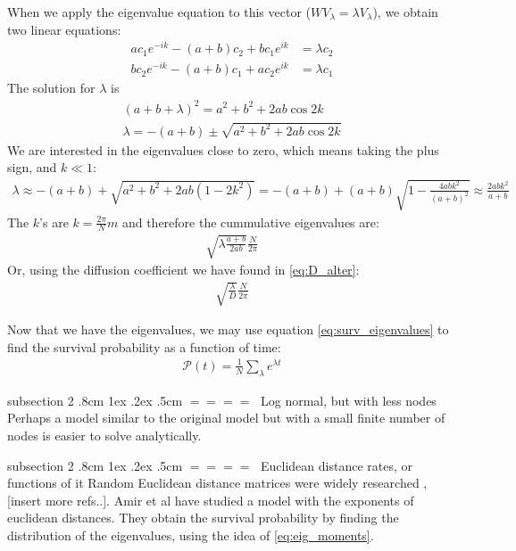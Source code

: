 \documentclass[onecolumn,fleqn,notitlepage,secnumarabic]{revtex4}
\makeatletter
\def\subsection{%
  \@startsection
    {subsection}%
    {2}%
    {\z@}%
    {.8cm \@plus1ex \@minus .2ex}%
    {.5cm}%
    {\normalfont\small\bfseries$=\!=\!=\!=\;$}%
}%
\makeatother
\begin{document}
When we apply the eigenvalue equation to this vector ($WV_\lambda = \lambda V_\lambda$), we obtain two linear equations:
\begin{align}
ac_1e^{-ik}   -(a+b)c_2 +bc_1e^{ik} &= \lambda c_2 \\
bc_2e^{-ik}   -(a+b)c_1 +ac_2e^{ik} &= \lambda c_1 
\end{align}
The solution for $\lambda$ is
\begin{align}
(a+b+\lambda)^2 = a^2+b^2+2ab\cos 2k \\
\lambda = -(a + b) \pm \sqrt{a^2+b^2+2ab\cos 2k}  \label{eq:abab_eigenvals}
\end{align}
We are interested in the eigenvalues close to zero, which means taking the plus sign, and $k\ll 1$:
\begin{align}
\lambda \approx -(a + b) + \sqrt{a^2+b^2+2ab(1-2k^2)} = -(a+b) +(a+b)\sqrt{1 - \frac{4abk^2}{(a+b)^2}}\approx \frac{2abk^2}{a+b}
\end{align}
The $k$'s are $k=\frac{2\pi}{N}m$ and therefore the cummulative eigenvalues are:
\begin{align}
\sqrt{\lambda\frac{a+b}{2ab}}\frac{N}{2\pi}
\end{align}
Or, using the diffusion coefficient we have found in \eqref{eq:D_alter}:
\begin{align}
\sqrt{\frac{\lambda}{D}}\frac{N}{2\pi}
\end{align}

Now that we have the eigenvalues, we may use equation \ref{eq:surv_eigenvalues} to find the survival probability as a function of time:
\begin{align}
\mathcal{P}(t) =\frac{1}{N}\sum_\lambda e^{\lambda t} 
\end{align}

\subsection{Log normal, but with less nodes}
Perhaps a model similar to the original model but with a small finite number of nodes is easier to solve analytically.


\subsection{Euclidean distance rates, or functions of it} \label{subsec:euclid}
Random Euclidean distance matrices were widely researched \cite{Mezard:1999:NPB}, [insert more refs..]. Amir et al \cite{Amir:2010:PRL} have studied a model with the exponents of euclidean distances. They obtain the survival probability by finding the distribution of the eigenvalues, using the idea of \ref{eq:eig_moments}. 
\end{document}
